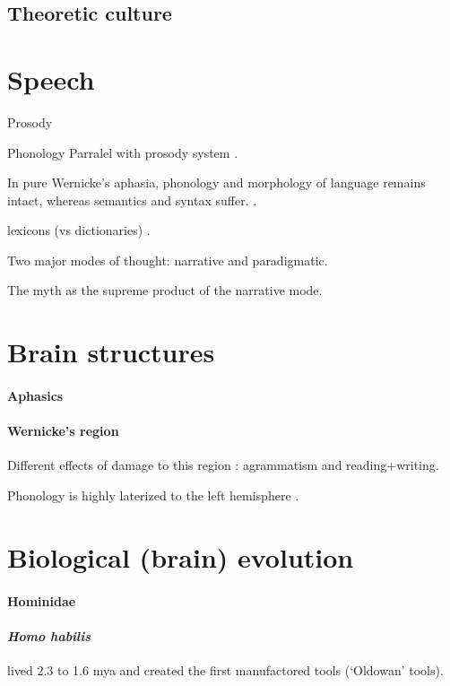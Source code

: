 \documentclass{article}
\begin{document}
\subsection{Theoretic culture}

\section{Speech}

Prosody

Phonology
Parralel with prosody system \citep[p.~249]{donald1991}.

In pure Wernicke's aphasia, phonology and morphology of language remains intact, whereas semantics and syntax suffer. \citep[p.~249]{donald1991}.

lexicons (vs dictionaries) \citep[fig.~7.1, p.~251]{donald1991}.

Two major modes of thought: narrative and paradigmatic.

The myth as the supreme product of the narrative mode.

\section{Brain structures}

\paragraph{Aphasics}

\paragraph{Wernicke's region}

Different effects of damage to this region \citep[p.~262]{donald1991}: agrammatism and reading+writing.

Phonology is highly laterized to the left hemisphere \citep[p.~262]{donald1991}.

\section{Biological (brain) evolution}
\label{sec:biological_evolution}

\paragraph{Hominidae}

\paragraph{\textit{Homo habilis}} lived 2.3 to 1.6 mya and created the first manufactored tools (`Oldowan' tools).
\end{document}
